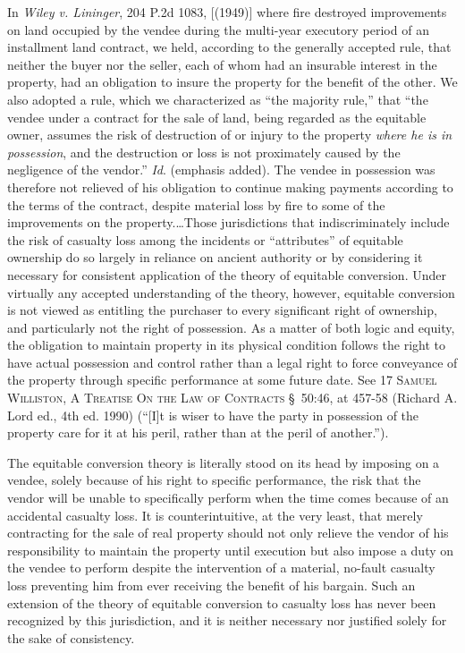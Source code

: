 In \textit{Wiley v. Lininger}, 204 P.2d 1083, [(1949)] where fire destroyed
improvements on land occupied by the vendee during the multi-year executory
period of an installment land contract, we held, according to the generally
accepted rule, that neither the buyer nor the seller, each of whom had an
insurable interest in the property, had an obligation to insure the property
for the benefit of the other. We also adopted a rule, which we characterized as
``the majority rule,'' that ``the vendee under a contract for the sale of land,
being regarded as the equitable owner, assumes the risk of destruction of or
injury to the property \textit{where he is in possession}, and the destruction
or loss is not proximately caused by the negligence of the vendor.''
\textit{Id}. (emphasis added). The vendee in possession was therefore not
relieved of his obligation to continue making payments according to the terms
of the contract, despite material loss by fire to some of the improvements on
the property.\ldots Those jurisdictions that indiscriminately include the risk
of casualty loss among the incidents or ``attributes'' of equitable
ownership do so largely in reliance on ancient authority or by considering it
necessary for consistent application of the theory of equitable conversion.
Under virtually any accepted understanding of the theory, however, equitable
conversion is not viewed as entitling the purchaser to every significant right
of ownership, and particularly not the right of possession. As a matter of both
logic and equity, the obligation to maintain property in its physical condition
follows the right to have actual possession and control rather than a legal
right to force conveyance of the property through specific performance at some
future date. See 17 \textsc{Samuel Williston, A Treatise On the Law of
Contracts} \S~50:46, at 457-58 (Richard A. Lord ed., 4th ed. 1990) (``[I]t is
wiser to have the party in possession of the property care for it at his peril,
rather than at the peril of another.''). 

The equitable conversion theory is literally stood on its head by imposing on a
vendee, solely because of his right to specific performance, the risk that the
vendor will be unable to specifically perform when the time comes because of an
accidental casualty loss. It is counterintuitive, at the very least, that
merely contracting for the sale of real property should not only relieve the
vendor of his responsibility to maintain the property until execution but also
impose a duty on the vendee to perform despite the intervention of a material,
no-fault casualty loss preventing him from ever receiving the benefit of his
bargain. Such an extension of the theory of equitable conversion to casualty
loss has never been recognized by this jurisdiction, and it is neither
necessary nor justified solely for the sake of consistency. 

